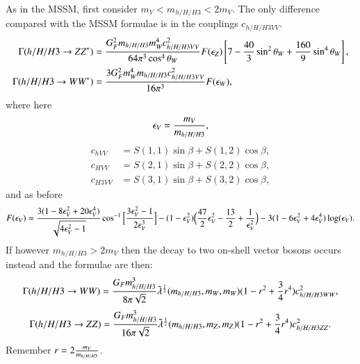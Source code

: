 \documentclass[final,3p,times,pdflatex]{elsarticle}
\begin{document}
As in the MSSM, first consider $m_V < m_{h/H/H3} < 2m_V$. The only difference compared with the MSSM formulae is in the couplings $c_{h/H/H3VV}$.
\begin{align} \label{hZZstarNMSSM}
\Gamma(h/H/H3 \rightarrow ZZ^*) &= {G_{F}^2 m_{h/H/H3} m_{W}^4 c_{h/H/H3VV}^2 \over 64 \pi^3 \cos^4\theta_W}
F(\epsilon_{Z}) \left[7 - {40 \over 3} \sin^2 \theta_W + {160 \over 9} \sin^4 \theta_W\right], \\ 
\Gamma(h/H/H3 \rightarrow WW^*) &= {3G_{F}^2 m_{W}^4 m_{h/H/H3} c_{h/H/H3VV}^2 \over 16 \pi^3}  F(\epsilon_{W}) , \label{hWWstarNMSSM}
\end{align}
where here
\begin{equation}
\epsilon_{V} = {m_V \over m_{h/H/H3}},
\end{equation}
\begin{align}
c_{hVV} &= S(1,1)\sin\beta + S(1,2)\cos\beta, \\
c_{HVV} &= S(2,1)\sin\beta + S(2,2)\cos\beta, \\
c_{H3VV} &= S(3,1)\sin\beta + S(3,2)\cos\beta,  
\end{align}
and as before
\begin{equation}
\begin{aligned}
F(\epsilon_{V}) = {3(1-8\epsilon_{V}^2 + 20\epsilon_{V}^4) \over \sqrt{4\epsilon_{V}^2-1}}\cos^{-1} \Big[{3\epsilon_{V}^2-1 \over 2\epsilon_{V}^3}\Big] - (1-\epsilon_{V}^2)\Big({47 \over 2}\epsilon_{V}^2 -{13 \over 2} + {1 \over \epsilon_{V}^2}\Big) - 3(1-6\epsilon_{V}^2+4\epsilon_{V}^4)\log(\epsilon_{V}).
\end{aligned}
\end{equation}
If however $m_{h/H/H3} > 2m_{V}$ then the decay to two on-shell vector bosons occurs instead and the formulae are then:
\begin{equation} \label{hWWNMSSM}
\Gamma(h/H/H3 \rightarrow WW) = {G_{F} m_{h/H/H3}^3 \over  8\pi \sqrt{2}} \tilde{\lambda}^{1 \over 2}(m_{h/H/H3},m_{W},m_{W})(1-r^2 + {3 \over 4}r^4)c_{h/H/H3WW}^2,
\end{equation}
\begin{equation} \label{hZZNMSSM}
\Gamma(h/H/H3 \rightarrow ZZ) = {G_{F} m_{h/H/H3}^3 \over 16\pi \sqrt{2}} \tilde{\lambda}^{1 \over 2}(m_{h/H/H3},m_{Z},m_{Z})(1-r^2 + {3 \over 4}r^4)c_{h/H/H3ZZ}^2.
\end{equation}
Remember $r = 2{m_{V} \over m_{h/H/H3}}$.
\end{document}
